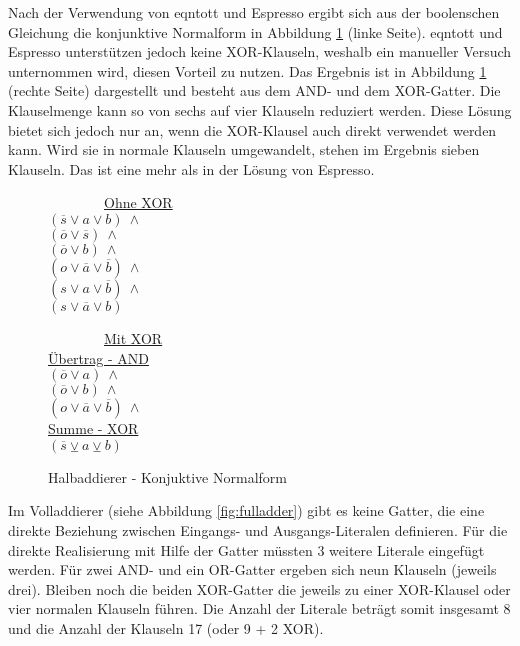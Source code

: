 Nach der Verwendung von eqntott und Espresso ergibt sich aus der boolenschen Gleichung die konjunktive Normalform in Abbildung \ref{fig:halfadder_cnf} (linke Seite).
eqntott und Espresso unterstützen jedoch keine XOR-Klauseln, weshalb ein manueller Versuch unternommen wird, diesen Vorteil zu nutzen. Das Ergebnis ist in Abbildung
\ref{fig:halfadder_cnf} (rechte Seite) dargestellt und besteht aus dem AND- und dem XOR-Gatter. Die Klauselmenge kann so von sechs auf vier Klauseln reduziert werden.
Diese Lösung bietet sich jedoch nur an, wenn die XOR-Klausel auch direkt verwendet werden kann. Wird sie in normale Klauseln umgewandelt, stehen im Ergebnis sieben
Klauseln. Das ist eine mehr als in der Lösung von Espresso.
\begin{figure}[!h]
  \centering
  \begin{minipage}[l]{5cm}
    ~~~~~~~~\underline{Ohne XOR}\\
    $ (\overline{s} \vee a \vee b) ~ \wedge $\\
    $ (\overline{o} \vee \overline{s}) ~ \wedge $\\
    $ (\overline{o} \vee b) ~ \wedge $\\
    $ (o \vee \overline{a} \vee \overline{b}) ~ \wedge $\\
    $ (s \vee a \vee \overline{b}) ~ \wedge $\\
    $ (s \vee \overline{a} \vee b) $
  \end{minipage}
  \begin{minipage}[l]{5cm}
    ~~~~~~~~\underline{Mit XOR}\\
    \underline{Übertrag - AND}\\
    $ (\overline{o} \vee a) ~ \wedge $\\
    $ (\overline{o} \vee b) ~ \wedge $\\
    $ (o \vee \overline{a} \vee \overline{b}) ~ \wedge $\\
    \underline{Summe - XOR}\\
    $ (\overline{s} \veebar a \veebar b) $
  \end{minipage}
  \caption{Halbaddierer - Konjuktive Normalform}
  \label{fig:halfadder_cnf}
\end{figure}

Im Volladdierer (siehe Abbildung \ref{fig:fulladder}) gibt es keine Gatter, die eine direkte Beziehung zwischen Eingangs- und Ausgangs-Literalen definieren.
Für die direkte Realisierung mit Hilfe der Gatter müssten 3 weitere Literale eingefügt werden. Für zwei AND- und ein OR-Gatter ergeben sich neun Klauseln (jeweils drei).
Bleiben noch die beiden XOR-Gatter die jeweils zu einer XOR-Klausel oder vier normalen Klauseln führen. Die Anzahl der Literale beträgt somit insgesamt 8 und die Anzahl der
Klauseln 17 (oder 9 + 2 XOR).

